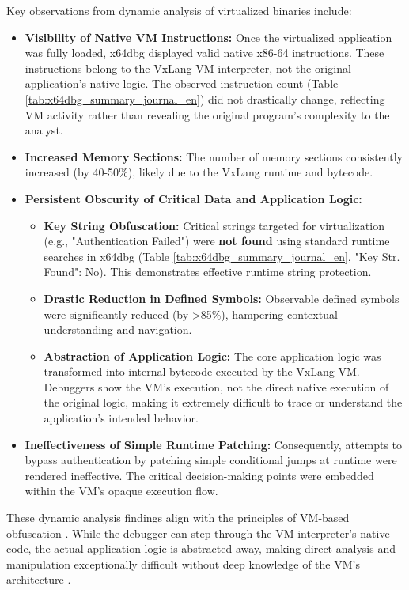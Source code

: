 Key observations from dynamic analysis of virtualized binaries include:
\begin{itemize}
    \item \textbf{Visibility of Native VM Instructions:} Once the virtualized application was fully loaded, x64dbg displayed valid native x86-64 instructions. These instructions belong to the VxLang VM interpreter, not the original application's native logic. The observed instruction count (Table \ref{tab:x64dbg_summary_journal_en}) did not drastically change, reflecting VM activity rather than revealing the original program's complexity to the analyst.
    \item \textbf{Increased Memory Sections:} The number of memory sections consistently increased (by 40-50\%), likely due to the VxLang runtime and bytecode.
    \item \textbf{Persistent Obscurity of Critical Data and Application Logic:}
        \begin{itemize}
            \item \textbf{Key String Obfuscation:} Critical strings targeted for virtualization (e.g., "Authentication Failed") were \textbf{not found} using standard runtime searches in x64dbg (Table \ref{tab:x64dbg_summary_journal_en}, "Key Str. Found": No). This demonstrates effective runtime string protection.
            \item \textbf{Drastic Reduction in Defined Symbols:} Observable defined symbols were significantly reduced (by >85\%), hampering contextual understanding and navigation.
            \item \textbf{Abstraction of Application Logic:} The core application logic was transformed into internal bytecode executed by the VxLang VM. Debuggers show the VM's execution, not the direct native execution of the original logic, making it extremely difficult to trace or understand the application's intended behavior.
        \end{itemize}
    \item \textbf{Ineffectiveness of Simple Runtime Patching:} Consequently, attempts to bypass authentication by patching simple conditional jumps at runtime were rendered ineffective. The critical decision-making points were embedded within the VM's opaque execution flow.
\end{itemize}
These dynamic analysis findings align with the principles of VM-based obfuscation \cite{Sikorski2012, Ore06}. While the debugger can step through the VM interpreter's native code, the actual application logic is abstracted away, making direct analysis and manipulation exceptionally difficult without deep knowledge of the VM's architecture \cite{Sal18}.

